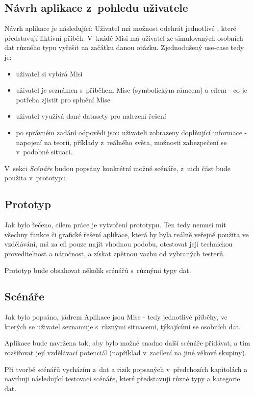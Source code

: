 \subsection{Návrh aplikace z~pohledu uživatele}
Návrh aplikace je následující:
Uživatel má možnost odehrát jednotlivé , které představují fiktivní příběh. V~každé Misi má uživatel ze simulovaných osobních dat různého typu vyřešit na začátku danou otázku.
Zjednodušený use-case tedy je:
\begin{itemize}
	\item uživatel si vybírá Misi
	\item uživatel je seznámen s~příběhem Mise (symbolickým rámcem) a cílem - co je potřeba zjistit pro splnění Mise
	\item uživatel využívá dané datasety pro nalezení řešení
	\item po správném zadání odpovědi jsou uživateli zobrazeny doplňující informace - napojení na teorii, příklady z~reálného světa, možnosti zabezpečení se v~podobné situaci.
\end{itemize}

V~sekci \textit{Scénáře} budou popsány konkrétní možné scénáře, z~nich část bude použita v~prototypu.

\subsection{Prototyp}
Jak bylo řečeno, cílem práce je vytvoření prototypu. Ten tedy nemusí mít všechny funkce či grafické řešení aplikace, která by byla reálně veřejně použita ve vzdělávání, má za cíl pouze najít vhodnou podobu, otestovat její technickou proveditelnost a náročnost, a získat zpětnou vazbu od vybraných testerů.

Prototyp bude obsahovat několik scénářů s~různými typy dat.


\subsection{Scénáře}
Jak bylo popsáno, jádrem Aplikace jsou Mise - tedy jednotlivé příběhy, ve kterých se uživatel seznamuje s~různými situacemi, týkajícími se osobních dat.

Aplikace bude navržena tak, aby bylo možné snadno další scénáře přidávat, a tím rozšiřovat její vzdělávací potenciál (například v~zacílení na jiné věkové skupiny).

Při tvorbě scénářů vycházím z~dat a rizik popsaných v~předchozích kapitolách a navrhuji následující testovací scénáře, které představují různé typy a kategorie dat.


